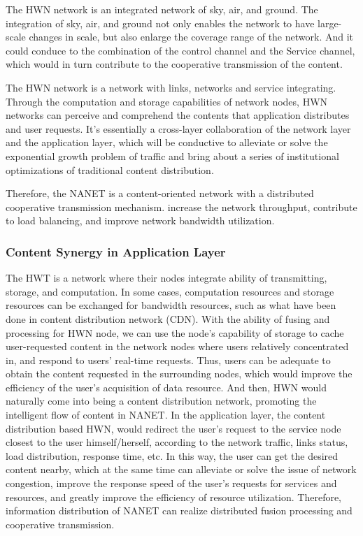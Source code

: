 \documentclass[journal,comsoc]{IEEEtran}
\begin{document}
	The HWN network is an integrated network of sky, air, and ground. 
	The integration of sky, air, and ground not only enables the network to have large-scale changes in scale,
	but also enlarge the coverage range of the network.
	And it could conduce to the combination of the control channel and the Service channel, which would in turn contribute to the cooperative transmission of the content.
	
	The HWN network is a network with links, networks and service integrating.
	Through the computation and storage capabilities of network nodes, HWN networks can perceive and comprehend the contents that application distributes and user requests.
	It's essentially a cross-layer collaboration of the network layer and the application layer, 
	which will be conductive to alleviate or solve the exponential growth problem of traffic and bring about a series of  institutional optimizations of traditional content distribution.
	
	Therefore, the NANET is a content-oriented network with a distributed cooperative transmission mechanism. increase the network throughput, 
	contribute to load balancing, and improve network bandwidth utilization.
	
	\subsubsection{Content Synergy in Application Layer}
	The HWT is a network where their nodes integrate ability of transmitting, storage, and computation.
	In some cases, computation resources and storage resources can be exchanged for bandwidth resources, such as what have been done in content distribution network (CDN). 
	With the ability of fusing and processing for HWN node, we can use the node's capability of storage to cache user-requested content in the network nodes where users relatively concentrated in, and respond to users' real-time requests. Thus, users can be adequate to obtain the content requested in the surrounding nodes, which would improve the efficiency of the user's acquisition of data resource.
	And then, HWN would naturally come into being a content distribution network, promoting the intelligent flow of content in NANET.
	In the application layer, the content distribution based HWN, would redirect the user's request to the service node closest to the user himself/herself, according to the network traffic, links status, load distribution, response time, etc.
	In this way, the user can get the desired content nearby, which at the same time can alleviate or solve the issue of network congestion, improve the response speed of the user's requests for services and resources, and greatly improve the efficiency of resource utilization.
	Therefore, information distribution of NANET can realize distributed fusion processing and cooperative transmission.
	
\end{document}
